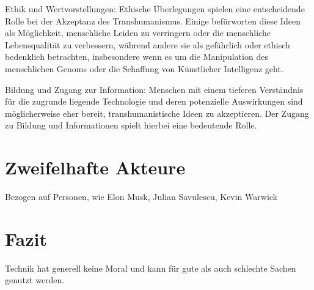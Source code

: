 \documentclass[a4paper,
DIV=13,
12pt,
BCOR=10mm,
department=FakEI,
twoside,
parskip=half,
automark,
]{OTHRartcl}
\begin{document}
Ethik und Wertvorstellungen: Ethische Überlegungen spielen eine entscheidende Rolle bei der Akzeptanz des Transhumanismus. Einige befürworten diese Ideen als Möglichkeit, menschliche Leiden zu verringern oder die menschliche Lebensqualität zu verbessern, während andere sie als gefährlich oder ethisch bedenklich betrachten, insbesondere wenn es um die Manipulation des menschlichen Genoms oder die Schaffung von Künstlicher Intelligenz geht.

Bildung und Zugang zur Information: Menschen mit einem tieferen Verständnis für die zugrunde liegende Technologie und deren potenzielle Auswirkungen sind möglicherweise eher bereit, transhumanistische Ideen zu akzeptieren. Der Zugang zu Bildung und Informationen spielt hierbei eine bedeutende Rolle.

\section*{Zweifelhafte Akteure}
Bezogen auf Personen, wie Elon Musk, Julian Savulescu, Kevin Warwick

\section*{Fazit}
Technik hat generell keine Moral und kann für gute als auch schlechte Sachen genutzt werden.
\newpage


\newpage
\end{document}
